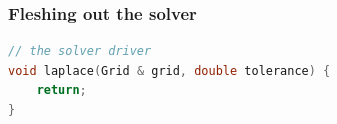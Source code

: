 \begin{frame}[fragile]
%
  \frametitle{Fleshing out the solver}
%
%
  \begin{lstlisting}[language=c++,name=seq:solver]
// the solver driver
void laplace(Grid & grid, double tolerance) {
    return;
}
  \end{lstlisting}
%
\end{frame}

